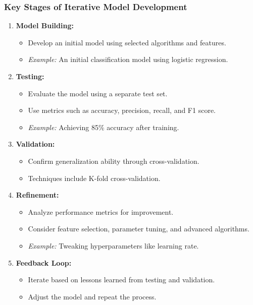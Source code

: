 \documentclass[aspectratio=169]{beamer}
\begin{document}
\begin{frame}[fragile]
    \frametitle{Key Stages of Iterative Model Development}
    \begin{enumerate}
        \item \textbf{Model Building:}
            \begin{itemize}
                \item Develop an initial model using selected algorithms and features.
                \item \textit{Example:} An initial classification model using logistic regression.
            \end{itemize}
        
        \item \textbf{Testing:}
            \begin{itemize}
                \item Evaluate the model using a separate test set.
                \item Use metrics such as accuracy, precision, recall, and F1 score.
                \item \textit{Example:} Achieving 85\% accuracy after training.
            \end{itemize}
        
        \item \textbf{Validation:}
            \begin{itemize}
                \item Confirm generalization ability through cross-validation.
                \item Techniques include K-fold cross-validation.
            \end{itemize}
        
        \item \textbf{Refinement:}
            \begin{itemize}
                \item Analyze performance metrics for improvement.
                \item Consider feature selection, parameter tuning, and advanced algorithms.
                \item \textit{Example:} Tweaking hyperparameters like learning rate.
            \end{itemize}
        
        \item \textbf{Feedback Loop:}
            \begin{itemize}
                \item Iterate based on lessons learned from testing and validation.
                \item Adjust the model and repeat the process.
            \end{itemize}
    \end{enumerate}
\end{frame}
\end{document}
